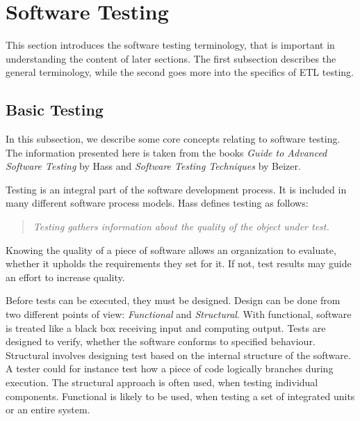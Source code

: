 \section{Software Testing}\label{sect:btesting}

This section introduces the software testing terminology, that is important in understanding the content of later sections. The first subsection describes the general terminology, while the second goes more into the specifics of ETL testing.

\subsection{Basic Testing}
In this subsection, we describe some core concepts relating to software testing. The information presented here is taken from the books \textit{Guide to Advanced Software Testing} by Hass\cite{Hass} and \textit{Software Testing Techniques} by Beizer\cite{Beizer}.

Testing is an integral part of the software development process. It is included in many different software process models. Hass defines testing as follows:
\begin{quotation} \textit{Testing gathers information about the quality of the object under test.}\end{quotation}
Knowing the quality of a piece of software allows an organization to evaluate, whether it upholds the requirements they set for it. If not, test results may guide an effort to increase quality.

Before tests can be executed, they must be designed. Design can be done from two different points of view: \emph{Functional} and \emph{Structural}. With functional, software is treated like a black box receiving input and computing output. Tests are designed to verify, whether the software conforms to specified behaviour. Structural involves designing test based on the internal structure of the software.  A tester could for instance test how a piece of code logically branches during execution. The structural approach is often used, when testing individual components. Functional is likely to be used, when testing a set of integrated units or an entire system.

